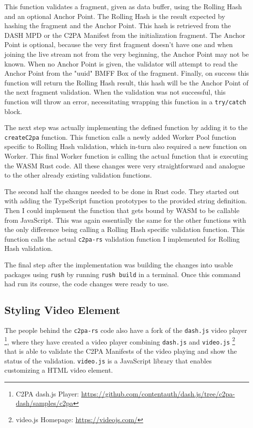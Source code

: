 This function validates a fragment, given as data buffer, using the Rolling Hash and an optional Anchor Point. The Rolling Hash is the result expected by hashing the fragment and the Anchor Point. This hash is retrieved from the DASH MPD or the C2PA Manifest from the initialization fragment. The Anchor Point is optional, because the very first fragment doesn't have one and when joining the live stream not from the very beginning, the Anchor Point may not be known. When no Anchor Point is given, the validator will attempt to read the Anchor Point from the "uuid" BMFF Box of the fragment. Finally, on success this function will return the Rolling Hash result, this hash will be the Anchor Point of the next fragment validation. When the validation was not successful, this function will throw an error, necessitating wrapping this function in a \texttt{try/catch} block.

The next step was actually implementing the defined function by adding it to the \texttt{createC2pa} function. This function calls a newly added Worker Pool function specific to Rolling Hash validation, which in-turn also required a new function on Worker. This final Worker function is calling the actual function that is executing the WASM Rust code. All these changes were very straightforward and analogue to the other already existing validation functions.

The second half the changes needed to be done in Rust code. They started out with adding the TypeScript function prototypes to the provided string definition. Then I could implement the function that gets bound by WASM to be callable from JavaScript. This was again essentially the same for the other functions with the only difference being calling a Rolling Hash specific validation function. This function calls the actual \texttt{c2pa-rs} validation function I implemented for Rolling Hash validation.

The final step after the implementation was building the changes into usable packages using \texttt{rush} by running \texttt{rush build} in a terminal. Once this command had run its course, the code changes were ready to use.

\subsection{Styling Video Element}

The people behind the \texttt{c2pa-rs} code also have a fork of the \texttt{dash.js} video player \footnote{C2PA dash.js Player: \url{https://github.com/contentauth/dash.js/tree/c2pa-dash/samples/c2pa}}, where they have created a video player combining \texttt{dash.js} and \texttt{video.js} \footnote{video.js Homepage: \url{https://videojs.com/}} that is able to validate the C2PA Manifests of the video playing and show the status of the validation. \texttt{video.js} is a JavaScript library that enables customizing a HTML video element.

